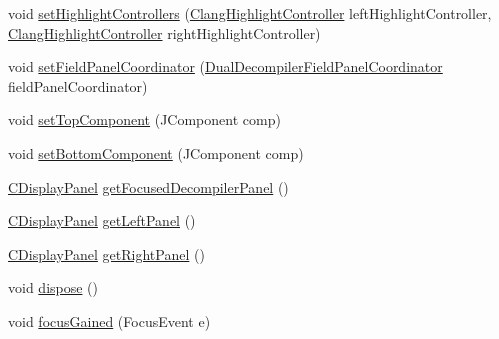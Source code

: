 \begin{DoxyCompactItemize}
\item 
void \mbox{\hyperlink{classghidra_1_1app_1_1decompiler_1_1component_1_1_decompiler_code_comparison_panel_a1504b8e552aff24d2870261c52ef478a}{set\+Highlight\+Controllers}} (\mbox{\hyperlink{classghidra_1_1app_1_1decompiler_1_1component_1_1_clang_highlight_controller}{Clang\+Highlight\+Controller}} left\+Highlight\+Controller, \mbox{\hyperlink{classghidra_1_1app_1_1decompiler_1_1component_1_1_clang_highlight_controller}{Clang\+Highlight\+Controller}} right\+Highlight\+Controller)
\item 
void \mbox{\hyperlink{classghidra_1_1app_1_1decompiler_1_1component_1_1_decompiler_code_comparison_panel_ad5ae2c6ce9078500f2777dfae56c5312}{set\+Field\+Panel\+Coordinator}} (\mbox{\hyperlink{classghidra_1_1app_1_1decompiler_1_1component_1_1_dual_decompiler_field_panel_coordinator}{Dual\+Decompiler\+Field\+Panel\+Coordinator}} field\+Panel\+Coordinator)
\item 
void \mbox{\hyperlink{classghidra_1_1app_1_1decompiler_1_1component_1_1_decompiler_code_comparison_panel_a5a9c242619288579ab2eb022a3677b0a}{set\+Top\+Component}} (J\+Component comp)
\item 
void \mbox{\hyperlink{classghidra_1_1app_1_1decompiler_1_1component_1_1_decompiler_code_comparison_panel_aae44b1eb0f3be2255c6a594a8d7ba4ad}{set\+Bottom\+Component}} (J\+Component comp)
\item 
\mbox{\hyperlink{classghidra_1_1app_1_1decompiler_1_1component_1_1_c_display_panel}{C\+Display\+Panel}} \mbox{\hyperlink{classghidra_1_1app_1_1decompiler_1_1component_1_1_decompiler_code_comparison_panel_aaabbc5a2961a16da03848319bb139d27}{get\+Focused\+Decompiler\+Panel}} ()
\item 
\mbox{\hyperlink{classghidra_1_1app_1_1decompiler_1_1component_1_1_c_display_panel}{C\+Display\+Panel}} \mbox{\hyperlink{classghidra_1_1app_1_1decompiler_1_1component_1_1_decompiler_code_comparison_panel_a61f49d43d10e1532c9bcd45cafca58b4}{get\+Left\+Panel}} ()
\item 
\mbox{\hyperlink{classghidra_1_1app_1_1decompiler_1_1component_1_1_c_display_panel}{C\+Display\+Panel}} \mbox{\hyperlink{classghidra_1_1app_1_1decompiler_1_1component_1_1_decompiler_code_comparison_panel_ae54faae55e80766a4e4f0f700ee7c1c0}{get\+Right\+Panel}} ()
\item 
void \mbox{\hyperlink{classghidra_1_1app_1_1decompiler_1_1component_1_1_decompiler_code_comparison_panel_a67fbfc760cd5649d8b2403133cca5dae}{dispose}} ()
\item 
void \mbox{\hyperlink{classghidra_1_1app_1_1decompiler_1_1component_1_1_decompiler_code_comparison_panel_a259bdedfece24ad6d6c6b30e5fac03bf}{focus\+Gained}} (Focus\+Event e)

\end{DoxyCompactItemize}
